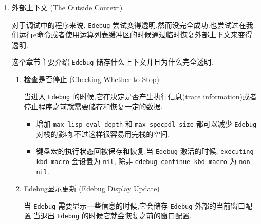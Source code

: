 \documentclass[11pt]{article}
\begin{document}
\begin{enumerate}
再以文档上的例子来做说明,

\begin{verbatim}
(defun fac (n)
  ;; (edebug) 只是返回了一次,不算覆盖.
  ;; (if (= n 0) ... 执行了6次,每次结果都是 =nil=.
  ;; = 和频次计数是没有关系的,切记.
  (if (= n 0) (edebug))
                                        ;#6           1      = =6
  ;; (< 0 n) 和 (if (< 0 n) ... 的执行频次都是一样,所以 (< 0 n) 没有显示频次
  ;; (< 0 n) 每次的结果都为 t,
  (if (< 0 n)
                                        ;#6
      ;; (* n (fac ...  以及它的子表达式的执行频次都是一样的(并且都在同一行),所以简化显示只显示了第一个表达式的执行频次.
      (* n (fac (1- n)))
                                        ;#    5
    1))
                                        ;#   6

(fac 5)
\end{verbatim}

还可以在 \texttt{Edebug} 调试中的时候使用 = 命令临时显示覆盖信息和频次计数.


\item 外部上下文 (The Outside Context)
\label{sec:org73642fe}

对于调试中的程序来说, \texttt{Edebug} 尝试变得透明,然而没完全成功.也尝试过在我们运行e命令或者使用运算列表缓冲区的时候通过临时恢复外部上下文来变得透明.

这个章节主要介绍 \texttt{Edebug} 储存什么上下文并且为什么完全透明.

\begin{enumerate}
\item 检查是否停止 (Checking Whether to Stop)
\label{sec:org9afb4fb}

当进入 \texttt{Edebug} 的时候,它在决定是否产生执行信息(trace information)或者停止程序之前就需要储存和恢复一定的数据.

\begin{itemize}
\item 增加 \texttt{max-lisp-eval-depth} 和 \texttt{max-specpdl-size} 都可以减少 \texttt{Edebug} 对栈的影响.不过这样很容易用完栈的空间.

\item 键盘宏的执行状态回被保存和恢复.当 \texttt{Edebug} 激活的时候, \texttt{executing-kbd-macro} 会设置为 \texttt{nil}, 除非 \texttt{edebug-continue-kbd-macro} 为 \texttt{non-nil}.
\end{itemize}

\item Edebug显示更新 (Edebug Display Update)
\label{sec:org6143a97}

当 \texttt{Edebug} 需要显示一些信息的时候,它会储存 \texttt{Edebug} 外部的当前窗口配置.当退出 \texttt{Edebug} 的时候它就会恢复之前的窗口配置.


\end{enumerate}
\end{enumerate}
\end{document}
